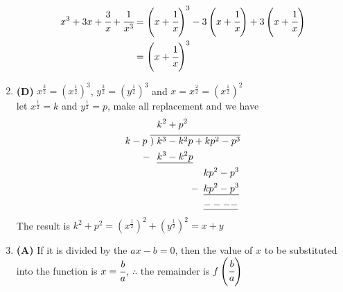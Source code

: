 \begin{multicols}{2}
\begin{enumerate}[label={\textbf{\arabic*.}}]
\begin{align*}
x^3 + 3x + \cfrac{3}{x} + \cfrac{1}{x^3} &= \left(x + \cfrac{1}{x}\right)^3 - 3\left(x + \cfrac{1}{x}\right) +3\left(x+ \cfrac{1}{x}\right) \\
& = \left(x + \cfrac{1}{x}\right)^3
\end{align*}
\item \textbf{(D)} $x^{\frac{3}{2}} = (x^{\frac{1}{2}})^3$, $y^{\frac{3}{2}} = (y^{\frac{1}{2}})^3$ and $x = x^{\frac{2}{2}} = (x^{\frac{1}{2}})^{2}$ \\
let $x^{\frac{1}{2}} = k$ and $y^{\frac{1}{2}} = p$, make all replacement and we have
\begin{align*}
& \hspace{7pt} k^2 + p^2 \\
k - p \hspace{3pt} & \overline{)\hspace{3pt} k^3  -k^2p  + kp^2 -p^3} \\
-& \hspace{7pt} \underline{k^3 -k^2p} \\
& \hspace{55pt} kp^2 - p^3 \\
-\hspace{-50pt} & \hspace{55pt} \underline{kp^2 - p^3} \\
& \hspace{55pt} \underline{----}
\end{align*}
The result is $k^2 + p^2 = (x^{\frac{1}{2}})^2 + (y^{\frac{1}{2}})^2 = x + y$
\item \textbf{(A)} If it is divided by the $ax-b = 0$, then the value of $x$ to be substituted into the function is $x = \cfrac{b}{a}$, $\therefore$  the remainder is  $f\left(\cfrac{b}{a}\right)$
\end{enumerate}
\end{multicols}
